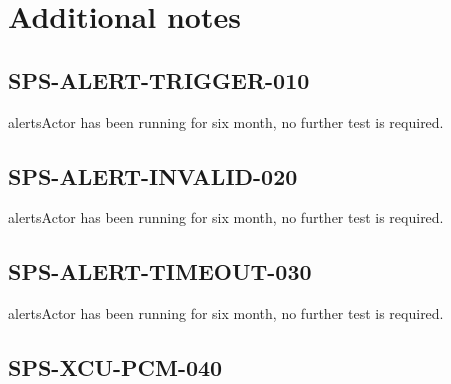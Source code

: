 \section{Additional notes}

\subsection{SPS-ALERT-TRIGGER-010}
\label{sec:tc-010}
alertsActor has been running for six month, no further test is required.

\subsection{SPS-ALERT-INVALID-020}
\label{sec:tc-020}

alertsActor has been running for six month, no further test is required.

\subsection{SPS-ALERT-TIMEOUT-030}
\label{sec:tc-030}

alertsActor has been running for six month, no further test is required.

\subsection{SPS-XCU-PCM-040}
\label{sec:tc-040}

